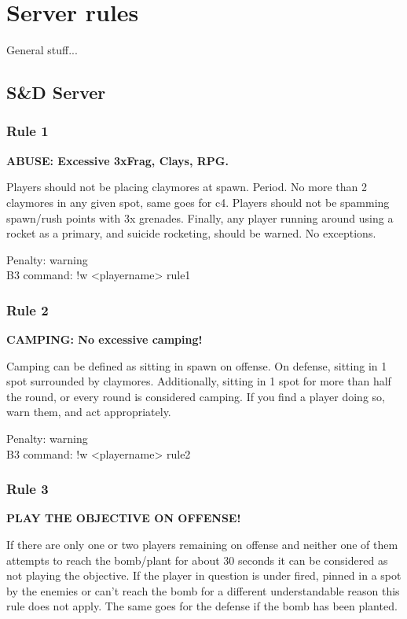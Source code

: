\chapter{Server rules}
General stuff...

\section{S\&D Server}
\subsection*{Rule 1}
\label{rules:sd:1}
\textbf{ABUSE: Excessive 3xFrag, Clays, RPG.}

Players should not be placing claymores at spawn. Period. No more than 2 claymores in any given spot, same goes for c4. Players should not be spamming spawn/rush points with 3x grenades. Finally, any player running around using a rocket as a primary, and suicide rocketing, should be warned. No exceptions. 

\begin{addmargin}[2em]{4em}
Penalty: warning \\
B3 command: !w <playername> rule1
\end{addmargin}




\subsection*{Rule 2}
\label{rules:sd:2}
\textbf{CAMPING: No excessive camping! }

Camping can be defined as sitting in spawn on offense. On defense, sitting in 1 spot surrounded by claymores. Additionally, sitting in 1 spot for more than half the round, or every round is considered camping. If you find a player doing so, warn them, and act appropriately. 

\begin{addmargin}[2em]{4em}
Penalty: warning \\
B3 command: !w <playername> rule2
\end{addmargin}

\subsection*{Rule 3}
\label{rules:sd:3}
\textbf{PLAY THE OBJECTIVE ON OFFENSE!}

If there are only one or two players remaining on offense and neither one of them attempts to reach the bomb/plant for about 30 seconds it can be considered as not playing the objective. If the player in question is under fired, pinned in a spot by the enemies or can't reach the bomb for a different understandable reason this rule does not apply.
The same goes for the defense if the bomb has been planted.

